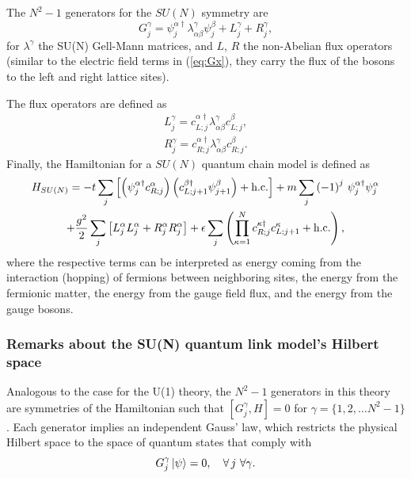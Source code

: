 \documentclass[a4paper]{report}
\begin{document}
\begin{spacing}{1.1}
The $N^2-1$ generators for the $SU(N)$ symmetry are
\begin{equation}
    G^\gamma_j = \psi^{\alpha \dagger}_j \lambda^\gamma_{\alpha \beta} \psi^\beta_j + L^\gamma_j + R^\gamma_j,
\end{equation}
for $\lambda^\gamma$ the SU(N) Gell-Mann matrices, and $L$, $R$ the non-Abelian flux operators (similar to the electric field terms in (\ref{eq:Gx}), they carry the flux of the bosons to the left and right lattice sites). 

The flux operators are defined as
\begin{align}
    L^\gamma_j = c^{\alpha \dagger}_{L;j} \lambda^\gamma_{\alpha \beta} c^\beta_{L;j},\\
    R^\gamma_j = c^{\alpha \dagger}_{R;j} \lambda^\gamma_{\alpha \beta} c^\beta_{R;j}.
\end{align}
Finally, the Hamiltonian for a $SU(N)$ quantum chain model is defined as \cite{dalmonte2016lattice}
\begin{multline}
    H_{SU(N)} =  -t \sum_j \left[ \left( \psi^{\alpha \dagger}_j c^\alpha_{R;j} \right)\left( c^{\beta \dagger}_{L;j+1} \psi^{\beta}_{j+1} \right) + \textnormal{h.c.} \right] + m \sum_j\left( -1 \right)^j\,\psi^{\alpha \dagger}_j \psi^\alpha_j\\
    + \frac{g^2}{2}\sum_j \left[ L^\alpha_j L^\alpha_j + R^\alpha_j R^\alpha_j \right] + \epsilon \sum_j \left( \prod_{\kappa=1}^N c^{\kappa \dagger}_{R;j} c^{\kappa}_{L;j+1} + \textnormal{h.c.} \right),
\end{multline}
where the respective terms can be interpreted as energy coming from the interaction (hopping) of fermions between neighboring sites, the energy from the fermionic matter, the energy from the gauge field flux, and the energy from the gauge bosons. 


\subsubsection{Remarks about the SU(N) quantum link model's Hilbert space}

Analogous to the case for the U(1) theory, the $N^2-1$ generators in this theory are symmetries of the Hamiltonian such that $\left[ G^\gamma_j, H \right] = 0$ for $\gamma = \{1,2,\dots N^2-1\}$. Each generator implies an independent Gauss' law, which restricts the physical Hilbert space to the space of quantum states that comply with
\begin{equation}
    G^\gamma_j \ket{\psi} = 0, \quad \forall \,j \,\, \forall \gamma.%
\end{equation}


\end{spacing}
\end{document}
